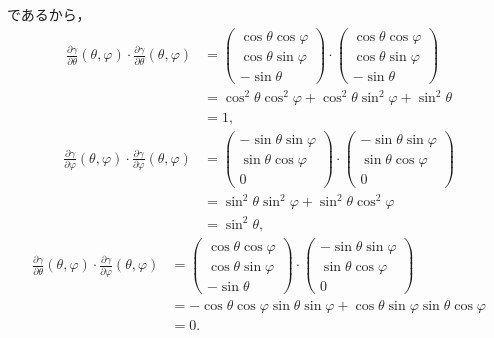 \documentclass{ltjsbook}
\begin{document}
であるから，
\begin{align*}
    \frac{\partial \gamma}{\partial \theta}(\theta, \varphi)
    \cdot
    \frac{\partial \gamma}{\partial \theta}(\theta, \varphi)
    &=
    \begin{pmatrix}
        \cos \theta \cos \varphi \\
        \cos \theta \sin \varphi \\
        - \sin \theta
    \end{pmatrix}
    \cdot
    \begin{pmatrix}
        \cos \theta \cos \varphi \\
        \cos \theta \sin \varphi \\
        - \sin \theta
    \end{pmatrix} \\
    &= \cos^2 \theta \cos^2 \varphi
        + \cos^2 \theta \sin^2 \varphi
        + \sin^2 \theta \\
    &= 1,
\end{align*}
\begin{align*}
    \frac{\partial \gamma}{\partial \varphi}(\theta, \varphi)
    \cdot
    \frac{\partial \gamma}{\partial \varphi}(\theta, \varphi)
    &=
    \begin{pmatrix}
        - \sin \theta \sin \varphi \\
        \sin \theta \cos \varphi \\
        0
    \end{pmatrix}
    \cdot
    \begin{pmatrix}
        - \sin \theta \sin \varphi \\
        \sin \theta \cos \varphi \\
        0
    \end{pmatrix} \\
    &= \sin^2 \theta \sin^2 \varphi + \sin^2 \theta \cos^2 \varphi \\
    &= \sin^2 \theta,
\end{align*}
\begin{align*}
    \frac{\partial \gamma}{\partial \theta}(\theta, \varphi)
    \cdot
    \frac{\partial \gamma}{\partial \varphi}(\theta, \varphi)
    &=
    \begin{pmatrix}
        \cos \theta \cos \varphi \\
        \cos \theta \sin \varphi \\
        - \sin \theta
    \end{pmatrix}
    \cdot
    \begin{pmatrix}
        - \sin \theta \sin \varphi \\
        \sin \theta \cos \varphi \\
        0
    \end{pmatrix} \\
    &= - \cos \theta \cos \varphi \sin \theta \sin \varphi
       + \cos \theta \sin \varphi \sin \theta \cos \varphi \\
    &= 0.
\end{align*}
\end{document}
